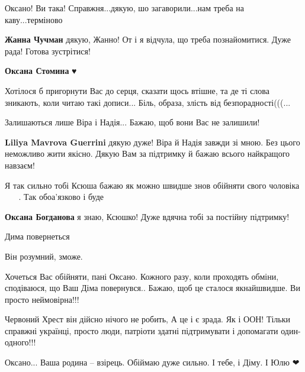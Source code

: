 
Оксано! Ви така! Справжня...дякую, шо загаворили...нам треба на каву...терміново

\begin{itemize} %
\textbf{Жанна Чучман} дякую, Жанно!
От і я відчула, що треба познайомитися. Дуже рада! Готова зустрітися!

\textbf{Оксана Стомина} ♥️

\end{itemize} %


Хотілося б пригорнути Вас до серця, сказати щось втішне, та де ті слова
зникають, коли читаю такі дописи... Біль, образа, злість від
безпорадності(((...

Залишаються лише Віра і Надія... Бажаю, щоб вони Вас не залишили! 🙏🙏🙏💙💛

\begin{itemize} %
\textbf{Liliya Mavrova Guerrini} дякую дуже! Віра й Надія завжди зі мною. Без цього неможливо жити якісно. Дякую Вам за підтримку й бажаю всього найкращого навзаєм!
\end{itemize} %


Я так сильно тобі Ксюша бажаю як можно швидше знов обійняти свого
чоловіка🙏🏼🙏🏼🙏🏼. Так обоа'язково і буде🙏🏼

\begin{itemize} %
\textbf{Оксана Богданова} я знаю, Ксюшко! Дуже вдячна тобі за постійну підтримку!
\end{itemize} %


Дима повернеться

Він розумний, зможе.


Хочеться Вас обійняти, пані Оксано. Кожного разу, коли проходять обміни,
сподіваюся, що Ваш Діма повернувся.. Бажаю, щоб це сталося якнайшвидше. Ви
просто неймовірна!!!


Червоний Хрест він дійсно нічого не робить, А це і є зрада. Як і ООН! Тільки
справжні українці, просто люди, патріоти здатні підтримувати і допомагати
один-одного!!!


Оксано... Ваша родина – взірець. Обіймаю дуже сильно. І тебе, і Діму. І Юлю
❤


